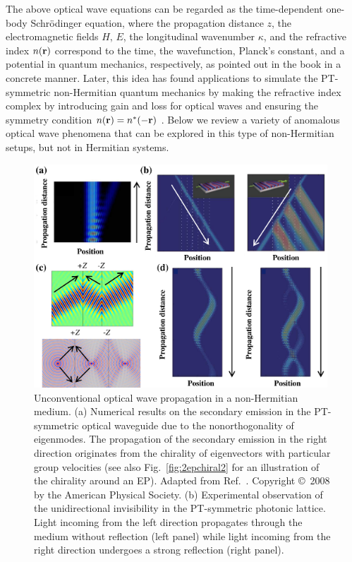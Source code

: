 \documentclass{tADP2e}
\theoremstyle{plain}
\theoremstyle{plain}
\theoremstyle{definition}
\begin{document}
The above optical wave equations can be regarded as the time-dependent one-body Schr{\"o}dinger equation, where the propagation distance $z$, the electromagnetic fields $H,\,E$, the longitudinal wavenumber $\kappa$, and the refractive index $n({\bf r})$ correspond to the time, the wavefunction, Planck's constant, and a potential in quantum mechanics, respectively, as pointed out in the book \cite{DD04} in a concrete manner. Later, this idea has found applications to simulate the PT-symmetric non-Hermitian quantum mechanics by making the refractive index complex by introducing gain and loss for optical waves and ensuring the symmetry condition $n({\bf r})=n^*(-{\bf r})$ \cite{AR05,REG07}. 
Below we review a variety of anomalous optical wave phenomena that can be explored in this type of non-Hermitian setups, but not in Hermitian systems.
\begin{figure}
\begin{center}
\includegraphics[width=11cm]{./Figures/fig_3_opt_wave.pdf}
\end{center}
\caption{
Unconventional optical wave propagation in a non-Hermitian medium.
(a) Numerical results on the secondary emission in the PT-symmetric optical waveguide due to the nonorthogonality of eigenmodes. The propagation of the secondary emission in the right direction originates from the chirality of eigenvectors with particular group velocities (see also Fig.~\ref{fig:2epchiral2} for an illustration of the chirality around an EP). 
Adapted from Ref.~\cite{KGM08}. Copyright \copyright\, 2008 by the American Physical Society. 
(b) Experimental observation of the unidirectional invisibility in the PT-symmetric photonic lattice. Light incoming from the left direction propagates through the medium without reflection (left panel) while light incoming from the right direction undergoes a strong reflection (right panel). 
}
\end{figure}
\end{document}
